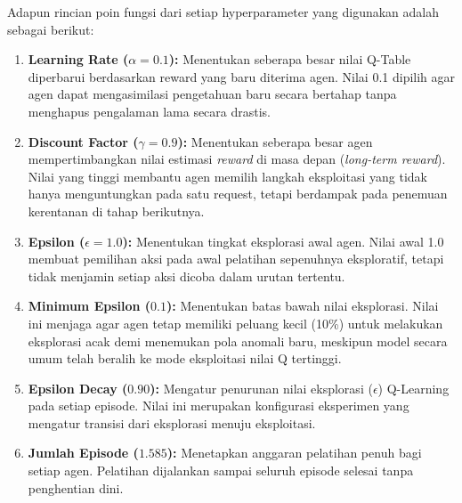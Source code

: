 Adapun rincian poin fungsi dari setiap hyperparameter yang digunakan adalah sebagai berikut:

\begin{enumerate}
    \item \textbf{Learning Rate ($\alpha = 0.1$):} Menentukan seberapa besar nilai Q-Table diperbarui berdasarkan reward yang baru diterima agen. Nilai 0.1 dipilih agar agen dapat mengasimilasi pengetahuan baru secara bertahap tanpa menghapus pengalaman lama secara drastis.
    \item \textbf{Discount Factor ($\gamma = 0.9$):} Menentukan seberapa besar agen mempertimbangkan nilai estimasi \textit{reward} di masa depan (\textit{long-term reward}). Nilai yang tinggi membantu agen memilih langkah eksploitasi yang tidak hanya menguntungkan pada satu request, tetapi berdampak pada penemuan kerentanan di tahap berikutnya.
    \item \textbf{Epsilon ($\epsilon = 1.0$):} Menentukan tingkat eksplorasi awal agen. Nilai awal 1.0 membuat pemilihan aksi pada awal pelatihan sepenuhnya eksploratif, tetapi tidak menjamin setiap aksi dicoba dalam urutan tertentu.
    \item \textbf{Minimum Epsilon ($0.1$):} Menentukan batas bawah nilai eksplorasi. Nilai ini menjaga agar agen tetap memiliki peluang kecil (10\%) untuk melakukan eksplorasi acak demi menemukan pola anomali baru, meskipun model secara umum telah beralih ke mode eksploitasi nilai Q tertinggi.
    \item \textbf{Epsilon Decay ($0.90$):} Mengatur penurunan nilai eksplorasi ($\epsilon$) Q-Learning pada setiap episode. Nilai ini merupakan konfigurasi eksperimen yang mengatur transisi dari eksplorasi menuju eksploitasi.
    \item \textbf{Jumlah Episode ($1.585$):} Menetapkan anggaran pelatihan penuh bagi setiap agen. Pelatihan dijalankan sampai seluruh episode selesai tanpa penghentian dini.
\end{enumerate}

